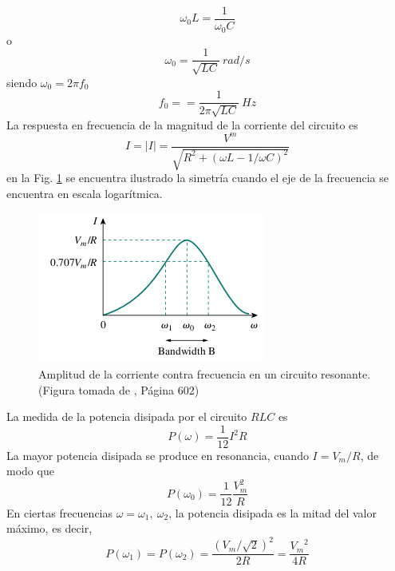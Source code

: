 \documentclass[twocolumn]{IEEEtran}
\begin{document}
\begin{equation}
 \omega _{0} L = \frac{1}{\omega _{0} C}
\label{ecu9}
\end{equation}
\noindent o
\begin{equation}
 \omega _{0} =\frac{1}{\sqrt{LC}}\ rad/s
\label{ecu10}
\end{equation}
\noindent siendo $\omega _{0} = 2 \pi f_0$
\begin{equation}
 f_0 = =\frac{1}{2\pi \sqrt{LC}}\ Hz
\label{ecu11}
\end{equation}
\noindent
La respuesta en frecuencia de la magnitud de la corriente del circuito es
\begin{equation}
 I = \left| I \right| = \frac{{{V^m}}}{{\sqrt {{R^2} + {{\left( {\omega L - 1/\omega C} \right)}^2}} }}
\label{ecu12}
\end{equation}
\noindent
en la Fig. \ref{fig3} se encuentra ilustrado la simetría cuando el eje de la frecuencia se encuentra en escala logarítmica.
\begin{figure}[H]
	\centering
		\includegraphics[scale=0.8]{ivsf.png}
	\caption{Amplitud de la corriente contra frecuencia en un circuito resonante. (Figura tomada de \cite{sadiku}, Página 602)}
	\label{fig3}
\end{figure}
\noindent
La medida de la potencia disipada por el circuito $RLC$ es
\begin{equation}
 P(\omega) = \frac{1}{12} I^{2} R
\label{ecu13}
\end{equation}
\noindent
La mayor potencia disipada se produce en resonancia, cuando $I = V_m / R$, de modo que
\begin{equation}
 P(\omega _0) = \frac{1}{12} \frac{V ^ {2}_{m}}{R}
\label{ecu14}
\end{equation}
\noindent
En ciertas frecuencias $\omega = \omega _1,\ \omega _2$, la potencia disipada es la mitad del valor máximo, es decir,
\begin{equation}
 P\left( {{\omega _1}} \right) = P\left( {{\omega _2}} \right) = \frac{{{{\left( {{V_m}/\sqrt 2 } \right)}^2}}}{{2R}} = \frac{{{V_m}^2}}{{4R}}
\label{ecu15}
\end{equation}
\end{document}
